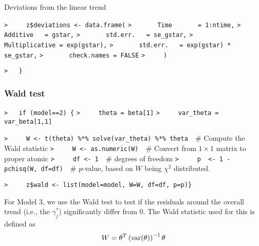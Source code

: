 \documentclass[a4paper]{article}
\begin{document}
Deviations from the linear trend\par
\verb~>     z$deviations <- data.frame(~\newline
\verb~>       Time       = 1:ntime,~\newline
\verb~>       Additive   = gstar,~\newline
\verb~>       std.err.   = se_gstar,~\newline
\verb~>       Multiplicative = exp(gstar),~\newline
\verb~>       std.err.   = exp(gstar) * se_gstar,~\newline
\verb~>       check.names = FALSE~\newline
\verb~>     )~\par

\verb~>   }~\par


\subsubsection{Wald test}\par

\verb~>   if (model==2) {~\newline
\verb~>     theta = beta[1]~\newline
\verb~>     var_theta = var_beta[1,1]~\par

\verb~>     W <- t(theta) %*% solve(var_theta) %*% theta  ~{\sffamily\# Compute the Wald statistic}\newline
\verb~>     W <- as.numeric(W)  ~{\sffamily\# Convert from $1\times1$ matrix to proper atomic}\newline
\verb~>     df <- 1  ~{\sffamily\# degrees of freedom}\newline
\verb~>     p  <- 1 - pchisq(W, df=df)  ~{\sffamily\# $p$-value, based on $W$ being $\chi^2$ distributed.}\par

\verb~>     z$wald <- list(model=model, W=W, df=df, p=p)}~\par

For Model 3, we use the Wald test to test if the residuals around the overall
trend (i.e., the $\gamma_j^\ast$) significantly differ from 0.
The Wald statistic used for this is defined as
\begin{equation}
  W = \theta^T \left(\operatorname{var}(\theta)\right)^{-1} \theta
\end{equation}\par
\end{document}
